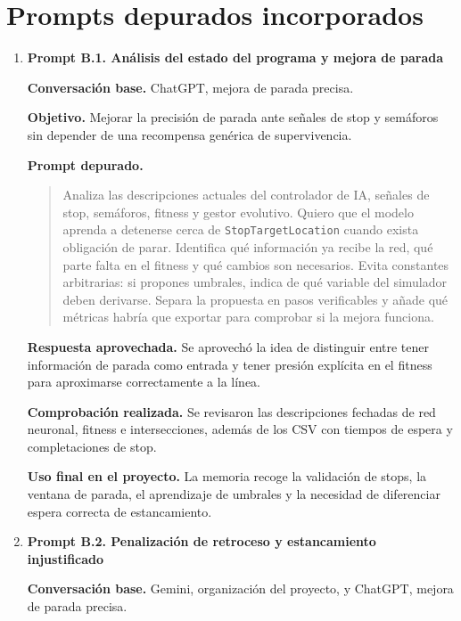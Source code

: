 \section{Prompts depurados incorporados}

\newcommand{\promptDepurado}{\Needspace{11\baselineskip}\textbf{Prompt depurado.}}

{\small
\begin{enumerate}[leftmargin=*,itemsep=0.2\baselineskip,topsep=2pt,parsep=0pt,partopsep=0pt]
  \item \textbf{Prompt B.1. Análisis del estado del programa y mejora de parada}

  \textbf{Conversación base.} ChatGPT, mejora de parada precisa.

  \textbf{Objetivo.} Mejorar la precisión de parada ante señales de stop y semáforos sin depender de una recompensa genérica de supervivencia.

  \promptDepurado
  \begin{quote}
  \small
  Analiza las descripciones actuales del controlador de IA, señales de stop, semáforos, fitness y gestor evolutivo. Quiero que el modelo aprenda a detenerse cerca de \texttt{StopTargetLocation} cuando exista obligación de parar. Identifica qué información ya recibe la red, qué parte falta en el fitness y qué cambios son necesarios. Evita constantes arbitrarias: si propones umbrales, indica de qué variable del simulador deben derivarse. Separa la propuesta en pasos verificables y añade qué métricas habría que exportar para comprobar si la mejora funciona.
  \end{quote}

  \textbf{Respuesta aprovechada.} Se aprovechó la idea de distinguir entre tener información de parada como entrada y tener presión explícita en el fitness para aproximarse correctamente a la línea.

  \textbf{Comprobación realizada.} Se revisaron las descripciones fechadas de red neuronal, fitness e intersecciones, además de los CSV con tiempos de espera y completaciones de stop.

  \textbf{Uso final en el proyecto.} La memoria recoge la validación de stops, la ventana de parada, el aprendizaje de umbrales y la necesidad de diferenciar espera correcta de estancamiento.

  \item \textbf{Prompt B.2. Penalización de retroceso y estancamiento injustificado}

  \textbf{Conversación base.} Gemini, organización del proyecto, y ChatGPT, mejora de parada precisa.


\end{enumerate}}
